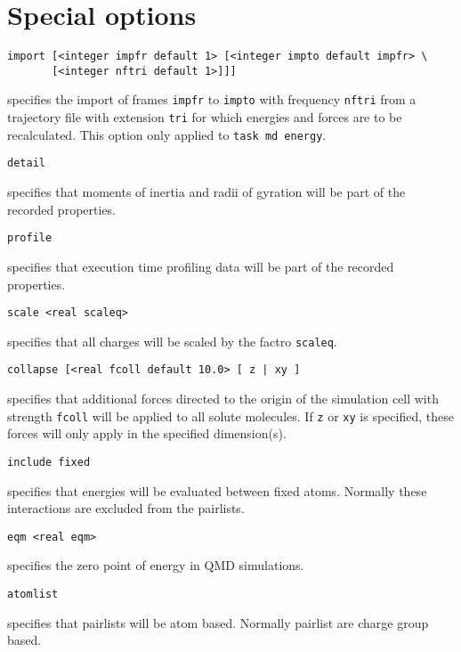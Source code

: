 \section{Special options}
\begin{description}

\item 
\begin{verbatim}
import [<integer impfr default 1> [<integer impto default impfr> \
       [<integer nftri default 1>]]]
\end{verbatim}
specifies the import of frames \verb+impfr+ to \verb+impto+ with 
frequency \verb+nftri+ from a trajectory file with extension
\verb+tri+ for which energies and forces are to be recalculated.
This option only applied to \verb+task md energy+.

\item 
\begin{verbatim}
detail
\end{verbatim}
specifies that moments of inertia and radii of gyration will be part of the
recorded properties.

\item 
\begin{verbatim}
profile
\end{verbatim}
specifies that execution time profiling data will be part of the
recorded properties.

\item 
\begin{verbatim}
scale <real scaleq>
\end{verbatim}
specifies that all charges will be scaled by the factro \verb+scaleq+.

\item 
\begin{verbatim}
collapse [<real fcoll default 10.0> [ z | xy ]
\end{verbatim}
specifies that additional forces directed to the origin of the
simulation cell with strength \verb+fcoll+ will be 
applied to all solute molecules. If \verb+z+ or \verb+xy+ is
specified, these forces will only apply in the specified dimension(s).


\item 
\begin{verbatim}
include fixed
\end{verbatim}
specifies that energies will be evaluated between fixed atoms.
Normally these interactions are excluded from the pairlists.


\item 
\begin{verbatim}
eqm <real eqm>
\end{verbatim}
specifies the zero point of energy in QMD simulations.

\item 
\begin{verbatim}
atomlist
\end{verbatim}
specifies that pairlists will be atom based. Normally pairlist
are charge group based.

\end{description}

